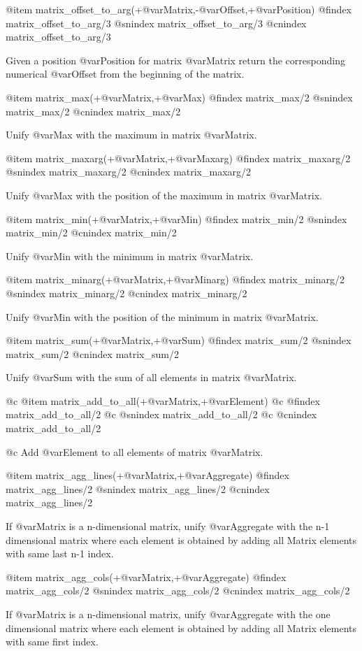 {{{{{{{{@item matrix_offset_to_arg(+@var{Matrix},-@var{Offset},+@var{Position})
@findex matrix_offset_to_arg/3
@snindex matrix_offset_to_arg/3
@cnindex matrix_offset_to_arg/3

Given a position @var{Position } for matrix @var{Matrix} return the
corresponding numerical @var{Offset} from the beginning of the matrix.

@item matrix_max(+@var{Matrix},+@var{Max})
@findex matrix_max/2
@snindex matrix_max/2
@cnindex matrix_max/2

Unify @var{Max} with the maximum in matrix  @var{Matrix}.

@item matrix_maxarg(+@var{Matrix},+@var{Maxarg})
@findex matrix_maxarg/2
@snindex matrix_maxarg/2
@cnindex matrix_maxarg/2

Unify @var{Max} with the position of the maximum in matrix  @var{Matrix}.

@item matrix_min(+@var{Matrix},+@var{Min})
@findex matrix_min/2
@snindex matrix_min/2
@cnindex matrix_min/2

Unify @var{Min} with the minimum in matrix  @var{Matrix}.

@item matrix_minarg(+@var{Matrix},+@var{Minarg})
@findex matrix_minarg/2
@snindex matrix_minarg/2
@cnindex matrix_minarg/2

Unify @var{Min} with the position of the minimum in matrix  @var{Matrix}.

@item matrix_sum(+@var{Matrix},+@var{Sum})
@findex matrix_sum/2
@snindex matrix_sum/2
@cnindex matrix_sum/2

Unify @var{Sum} with the sum of all elements in matrix  @var{Matrix}.

@c @item matrix_add_to_all(+@var{Matrix},+@var{Element})
@c @findex matrix_add_to_all/2
@c @snindex matrix_add_to_all/2
@c @cnindex matrix_add_to_all/2

@c Add @var{Element} to all elements of matrix  @var{Matrix}.

@item matrix_agg_lines(+@var{Matrix},+@var{Aggregate})
@findex matrix_agg_lines/2
@snindex matrix_agg_lines/2
@cnindex matrix_agg_lines/2

If @var{Matrix} is a n-dimensional matrix, unify @var{Aggregate} with
the n-1 dimensional matrix where each element is obtained by adding all
Matrix elements with same last n-1 index.

@item matrix_agg_cols(+@var{Matrix},+@var{Aggregate})
@findex matrix_agg_cols/2
@snindex matrix_agg_cols/2
@cnindex matrix_agg_cols/2

If @var{Matrix} is a n-dimensional matrix, unify @var{Aggregate} with
the one dimensional matrix where each element is obtained by adding all
Matrix elements with same  first index.

}}}}}}}}
